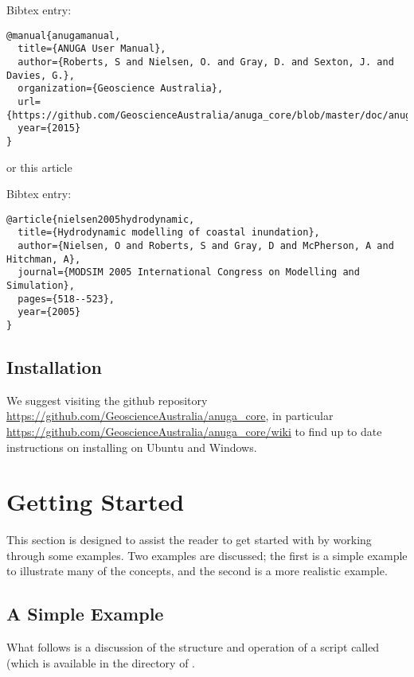 \documentclass{manual}
\begin{document}
Bibtex entry:
\begin{verbatim}
@manual{anugamanual,
  title={ANUGA User Manual},
  author={Roberts, S and Nielsen, O. and Gray, D. and Sexton, J. and Davies, G.},
  organization={Geoscience Australia},
  url={https://github.com/GeoscienceAustralia/anuga_core/blob/master/doc/anuga_user_manual.pdf},
  year={2015}
}
\end{verbatim}

or this article

Bibtex entry:
\begin{verbatim}
@article{nielsen2005hydrodynamic,
  title={Hydrodynamic modelling of coastal inundation},
  author={Nielsen, O and Roberts, S and Gray, D and McPherson, A and Hitchman, A},
  journal={MODSIM 2005 International Congress on Modelling and Simulation},
  pages={518--523},
  year={2005}
}
\end{verbatim}



\section{Installation}

We suggest visiting the github repository \url{https://github.com/GeoscienceAustralia/anuga_core}, in particular  \url{https://github.com/GeoscienceAustralia/anuga_core/wiki} to find up to date  instructions on installing \anuga{}  on Ubuntu and Windows.






\chapter{Getting Started}
\label{ch:getstarted}

This section is designed to assist the reader to get started with
\anuga by working through some examples. Two examples are discussed;
the first is a simple example to illustrate many of the concepts, and
the second is a more realistic example.


\section{A Simple Example}
\label{sec:simpleexample}

What follows is a discussion of the structure and operation of a
script called  (which is available in the 
directory of .
\end{document}
